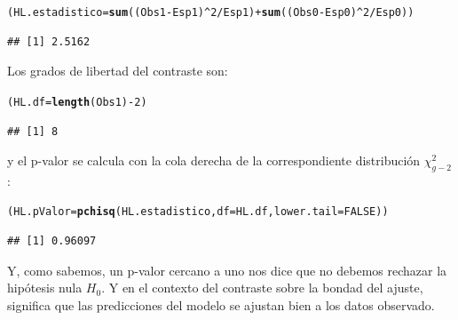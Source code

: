 \documentclass[10pt,a4paper]{article}\usepackage[]{graphicx}\usepackage[]{color}
\makeatletter
\newcommand{\hlnum}[1]{\textcolor[rgb]{0.686,0.059,0.569}{#1}}%
\newcommand{\hlopt}[1]{\textcolor[rgb]{0,0,0}{#1}}%
\newcommand{\hlstd}[1]{\textcolor[rgb]{0.345,0.345,0.345}{#1}}%
\newcommand{\hlkwb}[1]{\textcolor[rgb]{0.69,0.353,0.396}{#1}}%
\newcommand{\hlkwc}[1]{\textcolor[rgb]{0.333,0.667,0.333}{#1}}%
\newcommand{\hlkwd}[1]{\textcolor[rgb]{0.737,0.353,0.396}{\textbf{#1}}}%
\newenvironment{kframe}{%
 \def\at@end@of@kframe{}%
 \ifinner\ifhmode%
  \def\at@end@of@kframe{\end{minipage}}%
  \begin{minipage}{\columnwidth}%
 \fi\fi%
 \def\FrameCommand##1{\hskip\@totalleftmargin \hskip-\fboxsep
 \colorbox{shadecolor}{##1}\hskip-\fboxsep
     \hskip-\linewidth \hskip-\@totalleftmargin \hskip\columnwidth}%
 \MakeFramed {\advance\hsize-\width
   \@totalleftmargin\z@ \linewidth\hsize
   \@setminipage}}%
 {\par\unskip\endMakeFramed%
 \at@end@of@kframe}
\newenvironment{knitrout}{}{} %
\newcounter {cont01}
\makeatother
\begin{document}
\begin{knitrout}
\color{fgcolor}\begin{kframe}
\begin{alltt}
\hlstd{(HL.estadistico} \hlkwb{=} \hlkwd{sum}\hlstd{((Obs1} \hlopt{-} \hlstd{Esp1)}\hlopt{^}\hlnum{2}\hlopt{/}\hlstd{Esp1)} \hlopt{+} \hlkwd{sum}\hlstd{((Obs0} \hlopt{-} \hlstd{Esp0)}\hlopt{^}\hlnum{2}\hlopt{/}\hlstd{Esp0))}
\end{alltt}
\begin{verbatim}
## [1] 2.5162
\end{verbatim}
\end{kframe}
\end{knitrout}

Los grados de libertad del contraste son:

\begin{knitrout}
\color{fgcolor}\begin{kframe}
\begin{alltt}
\hlstd{(HL.df} \hlkwb{=} \hlkwd{length}\hlstd{(Obs1)} \hlopt{-} \hlnum{2}\hlstd{)}
\end{alltt}
\begin{verbatim}
## [1] 8
\end{verbatim}
\end{kframe}
\end{knitrout}


y el p-valor se calcula con la cola derecha de la correspondiente distribución $\chi^2_{g - 2}$:

\begin{knitrout}
\color{fgcolor}\begin{kframe}
\begin{alltt}
\hlstd{(HL.pValor} \hlkwb{=}  \hlkwd{pchisq}\hlstd{(HL.estadistico,} \hlkwc{df} \hlstd{= HL.df,} \hlkwc{lower.tail} \hlstd{=} \hlnum{FALSE}\hlstd{))}
\end{alltt}
\begin{verbatim}
## [1] 0.96097
\end{verbatim}
\end{kframe}
\end{knitrout}

Y, como sabemos, un p-valor cercano a uno nos dice que no debemos rechazar la hipótesis nula $H_0$. Y en el contexto del contraste sobre la bondad del ajuste, significa que las predicciones del modelo se ajustan bien a los datos observado.
\end{document}
